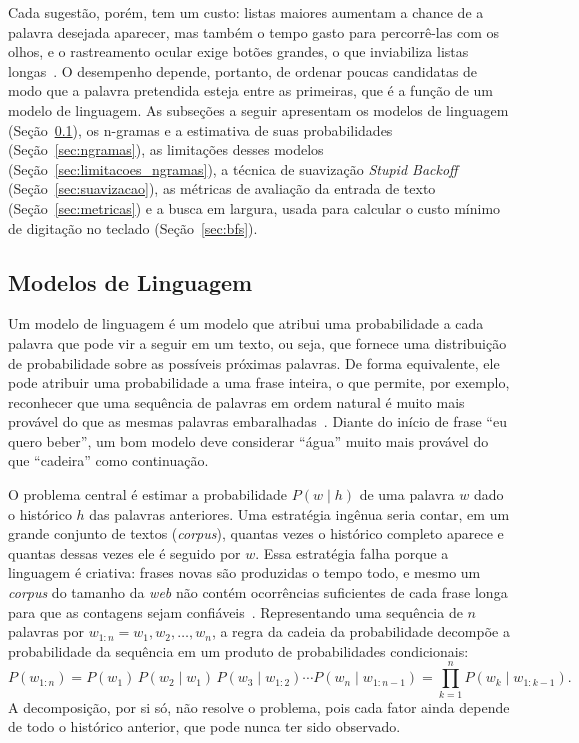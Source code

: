 Cada sugestão, porém, tem um custo: listas maiores aumentam a chance de a palavra desejada aparecer, mas também o tempo gasto para percorrê-las com os olhos, e o rastreamento ocular exige botões grandes, o que inviabiliza listas longas~\cite{mackenzie2008eye}. O desempenho depende, portanto, de ordenar poucas candidatas de modo que a palavra pretendida esteja entre as primeiras, que é a função de um modelo de linguagem. As subseções a seguir apresentam os modelos de linguagem (Seção~\ref{sec:modelos_linguagem}), os n-gramas e a estimativa de suas probabilidades (Seção~\ref{sec:ngramas}), as limitações desses modelos (Seção~\ref{sec:limitacoes_ngramas}), a técnica de suavização \textit{Stupid Backoff} (Seção~\ref{sec:suavizacao}), as métricas de avaliação da entrada de texto (Seção~\ref{sec:metricas}) e a busca em largura, usada para calcular o custo mínimo de digitação no teclado (Seção~\ref{sec:bfs}).

\subsection{Modelos de Linguagem} \label{sec:modelos_linguagem}

Um modelo de linguagem é um modelo que atribui uma probabilidade a cada palavra que pode vir a seguir em um texto, ou seja, que fornece uma distribuição de probabilidade sobre as possíveis próximas palavras. De forma equivalente, ele pode atribuir uma probabilidade a uma frase inteira, o que permite, por exemplo, reconhecer que uma sequência de palavras em ordem natural é muito mais provável do que as mesmas palavras embaralhadas~\cite[cap.~3]{jurafsky2026slp}. Diante do início de frase ``eu quero beber'', um bom modelo deve considerar ``água'' muito mais provável do que ``cadeira'' como continuação.

O problema central é estimar a probabilidade $P(w \mid h)$ de uma palavra $w$ dado o histórico $h$ das palavras anteriores. Uma estratégia ingênua seria contar, em um grande conjunto de textos (\textit{corpus}), quantas vezes o histórico completo aparece e quantas dessas vezes ele é seguido por $w$. Essa estratégia falha porque a linguagem é criativa: frases novas são produzidas o tempo todo, e mesmo um \textit{corpus} do tamanho da \textit{web} não contém ocorrências suficientes de cada frase longa para que as contagens sejam confiáveis~\cite[cap.~3]{jurafsky2026slp}. Representando uma sequência de $n$ palavras por $w_{1:n} = w_1, w_2, \ldots, w_n$, a regra da cadeia da probabilidade decompõe a probabilidade da sequência em um produto de probabilidades condicionais:
\begin{equation}
    P(w_{1:n}) = P(w_1)\,P(w_2 \mid w_1)\,P(w_3 \mid w_{1:2}) \cdots P(w_n \mid w_{1:n-1}) = \prod_{k=1}^{n} P(w_k \mid w_{1:k-1}).
    \label{eq:regra_cadeia}
\end{equation}
A decomposição, por si só, não resolve o problema, pois cada fator ainda depende de todo o histórico anterior, que pode nunca ter sido observado.

